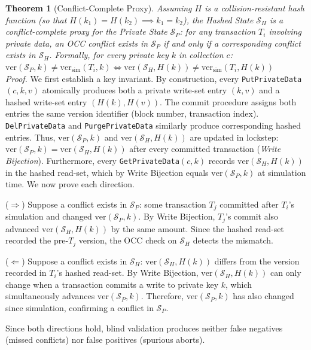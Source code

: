 \noindent\textbf{Theorem 1} (Conflict-Complete Proxy). \textit{Assuming $H$ is a collision-resistant hash function (so that $H(k_1) = H(k_2) \implies k_1 = k_2$), the Hashed State $\mathcal{S}_H$ is a conflict-complete
proxy for the Private State $\mathcal{S}_P$: for any transaction $T_i$ involving private data, an OCC conflict exists in $\mathcal{S}_P$ if and only if a corresponding conflict exists in $\mathcal{S}_H$.
Formally, for every private key $k$ in collection $c$:} \\
$\text{ver}(\mathcal{S}_P, k) \neq \text{ver}_{\text{sim}}(T_i, k) \iff \text{ver}(\mathcal{S}_H, H(k)) \neq \text{ver}_{\text{sim}}(T_i, H(k))$
\\
\textit{Proof.} We first establish a key invariant. By construction, every \texttt{PutPrivateData}$(c, k, v)$ atomically produces both a private write-set entry $(k, v)$ and a hashed write-set entry $(H(k), H(v))$. The commit procedure assigns both entries the same version identifier (block number, transaction index). \texttt{DelPrivateData} and \texttt{PurgePrivateData} similarly produce corresponding hashed entries. Thus, $\text{ver}(\mathcal{S}_P, k)$ and $\text{ver}(\mathcal{S}_H, H(k))$ are updated in lockstep: $\text{ver}(\mathcal{S}_P, k) = \text{ver}(\mathcal{S}_H, H(k))$ after every committed transaction (\textit{Write Bijection}). Furthermore, every \texttt{GetPrivateData}$(c, k)$ records $\text{ver}(\mathcal{S}_H, H(k))$ in the hashed read-set, which by Write Bijection equals $\text{ver}(\mathcal{S}_P, k)$ at simulation time. We now prove each direction.

($\Rightarrow$) Suppose a conflict exists in $\mathcal{S}_P$: some transaction $T_j$ committed after $T_i$'s simulation and changed $\text{ver}(\mathcal{S}_P, k)$. By Write Bijection, $T_j$'s commit also advanced $\text{ver}(\mathcal{S}_H, H(k))$ by the same amount. Since the hashed read-set recorded the pre-$T_j$ version, the OCC check on $\mathcal{S}_H$ detects the mismatch.

($\Leftarrow$) Suppose a conflict exists in $\mathcal{S}_H$: $\text{ver}(\mathcal{S}_H, H(k))$ differs from the version recorded in $T_i$'s hashed read-set. By Write Bijection, $\text{ver}(\mathcal{S}_H, H(k))$ can only change when a transaction commits a write to private key $k$, which simultaneously advances $\text{ver}(\mathcal{S}_P, k)$. Therefore, $\text{ver}(\mathcal{S}_P, k)$ has also changed since simulation, confirming a conflict in $\mathcal{S}_P$.

\noindent Since both directions hold, blind validation produces neither false negatives (missed conflicts) nor false positives (spurious aborts).

